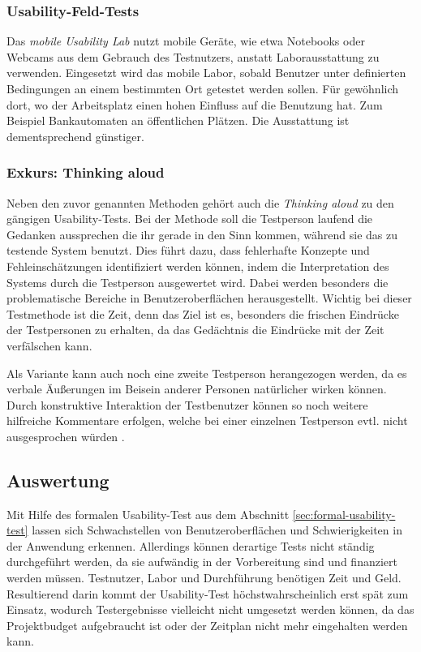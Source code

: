 \subsubsection{Usability-Feld-Tests}

Das \textit{mobile Usability Lab} nutzt mobile Geräte, wie etwa Notebooks oder Webcams aus dem Gebrauch des Testnutzers, anstatt Laborausstattung zu verwenden. 
Eingesetzt wird das mobile Labor, sobald Benutzer unter definierten Bedingungen an einem bestimmten Ort getestet werden sollen. 
Für gewöhnlich dort, wo der Arbeitsplatz einen hohen Einfluss auf die Benutzung hat. 
Zum Beispiel Bankautomaten an öffentlichen Plätzen. 
Die Ausstattung ist dementsprechend günstiger. \cite[vgl.][93\psq]{usabilityEngineeringKompakt}

\subsubsection{Exkurs: Thinking aloud\label{sec:thinking_aloud}}
Neben den zuvor genannten Methoden gehört auch die \emph{Thinking aloud} zu den gängigen Usability-Tests.
Bei der Methode soll die Testperson laufend die Gedanken aussprechen die ihr gerade in den Sinn kommen, während sie das zu testende System benutzt.
Dies führt dazu, dass fehlerhafte Konzepte und Fehleinschätzungen identifiziert werden können, indem die Interpretation des Systems durch die Testperson ausgewertet wird.
Dabei werden besonders die problematische Bereiche in Benutzeroberflächen herausgestellt.
Wichtig bei dieser Testmethode ist die Zeit, denn das Ziel ist es, besonders die frischen Eindrücke der Testpersonen zu erhalten, da das Gedächtnis die Eindrücke mit der Zeit verfälschen kann.

Als Variante kann auch noch eine zweite Testperson herangezogen werden, da es verbale Äußerungen im Beisein anderer Personen natürlicher wirken können.
Durch konstruktive Interaktion der Testbenutzer können so noch weitere hilfreiche Kommentare erfolgen, welche bei einer einzelnen Testperson evtl. nicht ausgesprochen würden \cite[vgl.][73\psq]{usability_engineering_software_developers}.

\subsection{Auswertung}

Mit Hilfe des formalen Usability-Test aus dem Abschnitt \ref{sec:formal-usability-test} lassen sich Schwachstellen von Benutzeroberflächen und Schwierigkeiten in der Anwendung erkennen.
Allerdings können derartige Tests nicht ständig durchgeführt werden, da sie aufwändig in der Vorbereitung sind und finanziert werden müssen. 
Testnutzer, Labor und Durchführung benötigen Zeit und Geld. 
Resultierend darin kommt der Usability-Test höchstwahrscheinlich erst spät zum Einsatz, wodurch Testergebnisse vielleicht nicht umgesetzt werden können, da das Projektbudget aufgebraucht ist oder der Zeitplan nicht mehr eingehalten werden kann. 

